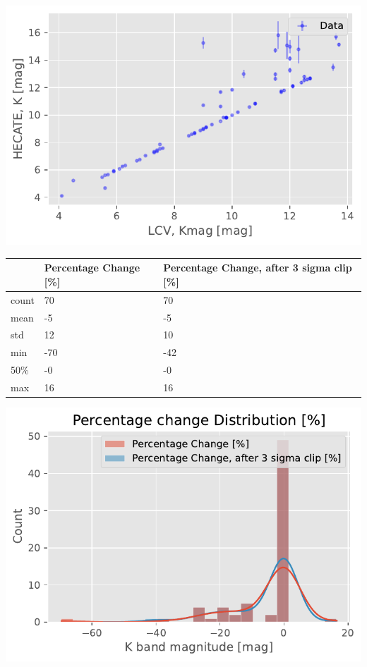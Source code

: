\documentclass[
]{article}
\begin{document}
\includegraphics{compare_files/figure-pdf/cell-39-output-1.pdf}

\begin{longtable}[]{@{}lll@{}}
\toprule\noalign{}
& Percentage Change {[}\%{]} & Percentage Change, after 3 sigma clip
{[}\%{]} \\
\midrule\noalign{}
\endhead
\bottomrule\noalign{}
\endlastfoot
count & 70 & 70 \\
mean & -5 & -5 \\
std & 12 & 10 \\
min & -70 & -42 \\
50\% & -0 & -0 \\
max & 16 & 16 \\
\end{longtable}

\includegraphics{compare_files/figure-pdf/cell-41-output-1.pdf}
\end{document}
